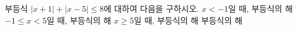부등식 $|x+1|+|x-5|\le 8$에 대하여 다음을 구하시오.
 $x<-1$일 때, 부등식의 해
 $-1\le x<5$일 때, 부등식의 해
 $x\ge 5$일 때, 부등식의 해
 부등식의 해
